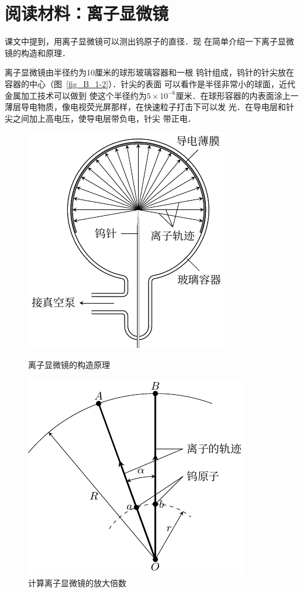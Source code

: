 \section*{阅读材料：离子显微镜}
    课文中提到，用离子显微镜可以测出钨原子的直径．现
在简单介绍一下离子显微镜的构造和原理．

    离子显微镜由半径约为10厘米的球形玻璃容器和一根
钨针组成，钨针的针尖放在容器的中心（图~\ref{fig_B_1-2}）．针尖的表面
可以看作是半径非常小的球面，近代金属加工技术可以做到
使这个半径约为$5\times 10^{-6}$厘米．在球形容器的内表面涂上一
薄层导电物质，像电视荧光屏那样，在快速粒子打击下可以发
光．在导电层和针尖之间加上高电压，使导电层带负电，针尖
带正电．

\begin{figure}[htbp]
    \centering
    \begin{minipage}[t]{0.4\linewidth}
    	\centering
    	\includegraphics{fig/B/1-2.pdf}
    	\caption{离子显微镜的构造原理}\label{fig_B_1-2}
    \end{minipage}
    \hfill
    \begin{minipage}[t]{0.59\linewidth}
    	\centering
    	\includegraphics{fig/B/1-3.pdf}
    	\caption{计算离子显微镜的放大倍数%
    	}\label{fig_B_1-3}
    \end{minipage}
\end{figure}


